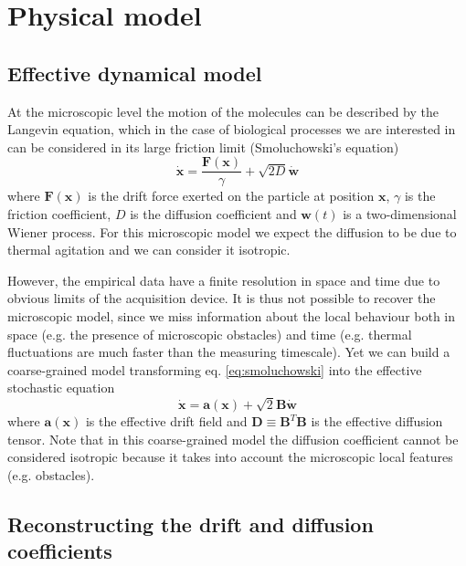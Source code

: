\documentclass[a4paper]{article}
\begin{document}
\section{Physical model}

\subsection{Effective dynamical model}

At the microscopic level the motion of the molecules can be described by the Langevin equation, which in the case of biological processes we are interested in can be considered in its large friction limit (Smoluchowski's equation)
\begin{equation} \label{eq:smoluchowski}
\dot{\bm{x}} = \frac{\bm{F}(\bm{x})}{\gamma} + \sqrt{2D} \dot{\bm{w}}
\end{equation}
where $\bm{F}(\bm{x})$ is the drift force exerted on the particle at position $\bm{x}$, $\gamma$ is the friction coefficient, $D$ is the diffusion coefficient and $\bm{w}(t)$ is a two-dimensional Wiener process. For this microscopic model we expect the diffusion to be due to thermal agitation and we can consider it isotropic.

However, the empirical data have a finite resolution in space and time due to obvious limits of the acquisition device. It is thus not possible to recover the microscopic model, since we miss information about the local behaviour both in space (e.g. the presence of microscopic obstacles) and time (e.g. thermal fluctuations are much faster than the measuring timescale). Yet we can build a coarse-grained model transforming eq. \ref{eq:smoluchowski} into the effective stochastic equation \cite{hoze2012} \cite{hoze2014}
\begin{equation} \label{eq:coarse-grained}
\dot{\bm{x}} = \bm{a}(\bm{x}) + \sqrt{2}\bm{B} \dot{\bm{w}}
\end{equation}
where $\bm{a}(\bm{x})$ is the effective drift field and $\bm{D} \equiv \bm{B}^T\bm{B}$ is the effective diffusion tensor. Note that in this coarse-grained model the diffusion coefficient cannot be considered isotropic because it takes into account the microscopic local features (e.g. obstacles).

\subsection{Reconstructing the drift and diffusion coefficients}
\end{document}
